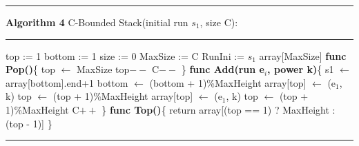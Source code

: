 \documentclass{article}
\begin{document}
\noindent\rule{\linewidth}{0.8pt}\par
\vspace{-0.3em} 
\noindent\textbf{Algorithm 4} C-Bounded Stack(initial run $s_1$, size C):\label{alg:stack}

\vspace{-0.6em} 
\noindent\rule{\linewidth}{0.5pt}\par 
\vspace{-0.5em} 
\begin{algorithmic}[1]
\State top := 1
\State bottom := 1
\State size := 0
\State MaxSize := C
\State RunIni := $s_1$ 
\State array[MaxSize]
\State \textbf{func Pop()}\{
 
\State top $\gets$ MaxSize
\Else
\State top$--$ 
\EndIf
\State C$--$ \}
\State \textbf{func Add(\textnormal{run e$_i$, power k})}\{
 
\State s1 $\gets$ array[bottom].end+1 
\State bottom $\gets$ (bottom + 1)\%MaxHeight
\State array[top] $\gets$ (e$_1$, k)
\State top $\gets$ (top + 1)\%MaxHeight
\Else
\State array[top] $\gets$ (e$_1$, k)
\State top $\gets$ (top + 1)\%MaxHeight
\State C$++$ 
\EndIf \}
\State \textbf{func Top()}\{
\State return array[(top == 1) ? MaxHeight : (top - 1)] \}
\end{algorithmic}
\vspace{-1em} 
\noindent\rule{\linewidth}{0.5pt}\par 
\end{document}
